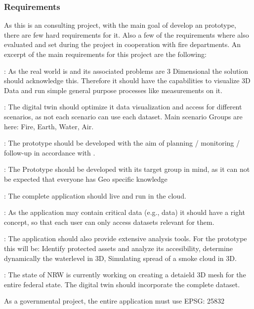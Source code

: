 \documentclass[11pt, titlepage, a4paper]{article}
\begin{document}
\subsubsection{Requirements}
As this is an consulting project, with the main goal of develop an prototype, there are few hard requirements for it. Also a few of the requirements where also evaluated and set during the project in cooperation with fire departments. An excerpt of the main requirements for this project are the following: 


\begin{description}[]
	\item[3 Dimensionality]: As the real world is and its associated problems are 3 Dimensional the solution should acknowledge this. Therefore it should have the capabilities to visualize 3D Data and run simple general purpose processes like measurements on it. 
	\item[Scenario Optimized Geodata]: The digital twin should optimize it data visualization and access for different scenarios, as not each scenario can use each dataset. Main scenario Groups are here: Fire, Earth, Water, Air.
	\item[Follow the ]: The prototype should be developed with the aim of planning / monitoring / follow-up in accordance with \glsxtrshort{bhkg}.
	\item[Target Group - Authorities and organizations with security tasks]:  The Prototype should be developed with its target group in mind, as it can not be expected that everyone has Geo specific knowledge 
	\item[Cloud based]: The complete application should live and run in the cloud.
	\item[Fine grained right concept]: As the application may contain critical data (e.g., data) it should have a right concept, so that each user can only access datasets relevant for them. 
	\item[Analysis tools]: The application should also provide extensive analysis tools. For the prototype this will be: Identify protected assets and analyze its accesibility, determine dynamically the waterlevel in 3D, Simulating spread of a smoke cloud in 3D.
	\item[Incoorporate 3D Meshes]:  The state of NRW is currently working on creating a detaield 3D mesh for the entire federal state. The digital twin should incorporate the complete dataset.
	\item[EPSG: 25832] As a governmental project, the entire application must use EPSG: 25832
\end{description}
\end{document}
